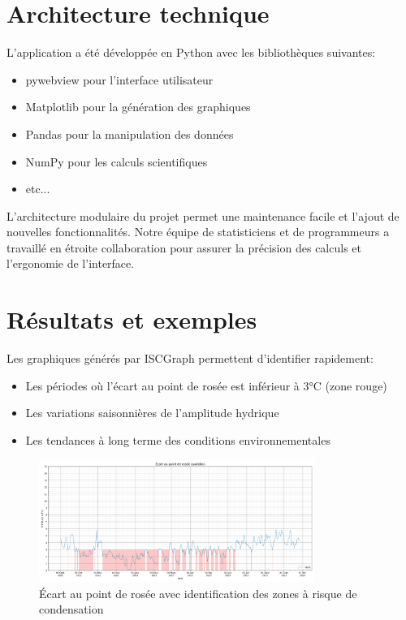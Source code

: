\documentclass[a4paper,11pt]{article}
\begin{document}
\section{Architecture technique}

L'application a été développée en Python avec les bibliothèques suivantes:
\begin{itemize}
    \item pywebview pour l'interface utilisateur
    \item Matplotlib pour la génération des graphiques
    \item Pandas pour la manipulation des données
    \item NumPy pour les calculs scientifiques
    \item etc... 
\end{itemize}

L'architecture modulaire du projet permet une maintenance facile et l'ajout de nouvelles fonctionnalités. Notre équipe de statisticiens et de programmeurs a travaillé en étroite collaboration pour assurer la précision des calculs et l'ergonomie de l'interface.

\section{Résultats et exemples}

Les graphiques générés par ISCGraph  permettent d'identifier rapidement:
\begin{itemize}
    \item Les périodes où l'écart au point de rosée est inférieur à 3°C (zone rouge)
    \item Les variations saisonnières de l'amplitude hydrique
    \item Les tendances à long terme des conditions environnementales
\end{itemize}

\begin{figure}[h]
    \centering
    \includegraphics[width=0.8\textwidth]{../screenshots/Écart_au_point_de_rosée_(risque_de_condensation)-id-dew_point_risk-20250506_143243.png}
    \caption{Écart au point de rosée avec identification des zones à risque de condensation}
\end{figure}
\end{document}
